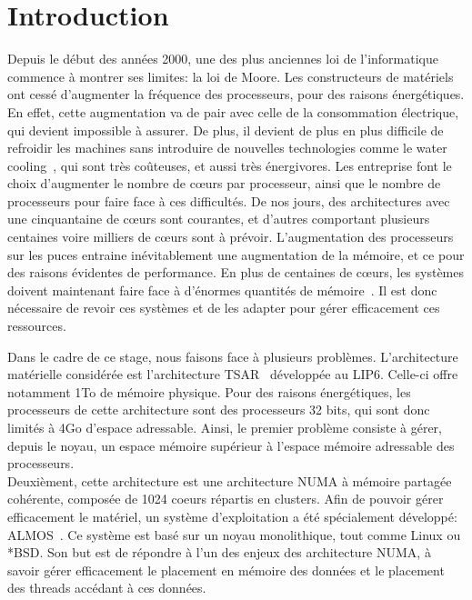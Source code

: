 \chapter{Introduction}

  \hspace{1cm}Depuis le début des années 2000, une des plus anciennes loi de
  l'informatique commence à montrer ses limites: la loi de Moore. Les
  constructeurs de matériels ont cessé d'augmenter la fréquence des processeurs,
  pour des raisons énergétiques. En effet, cette augmentation va de pair avec
  celle de la consommation électrique, qui devient impossible à assurer. De
  plus, il devient de plus en plus difficile de refroidir les machines sans
  introduire de nouvelles technologies comme le water
  cooling~\citep{googleXXXXdatacenters}, qui sont très coûteuses, et aussi très
  énergivores. Les entreprise font le choix d'augmenter le nombre de c\oe urs
  par processeur, ainsi que le nombre de processeurs pour faire face à ces
  difficultés. De nos jours, des architectures avec une cinquantaine de c\oe urs
  sont courantes, et d'autres comportant plusieurs centaines voire milliers de
  c\oe urs sont à prévoir. L'augmentation des processeurs sur les puces entraine
  inévitablement une augmentation de la mémoire, et ce pour des raisons
  évidentes de performance. En plus de centaines de c\oe urs, les systèmes
  doivent maintenant faire face à d'énormes quantités de
  mémoire~\citep{hp2012z820, puget2013z9pe}. Il est donc nécessaire de revoir
  ces systèmes et de les adapter pour gérer efficacement ces ressources.\newline

  \hspace{1cm} Dans le cadre de ce stage, nous faisons face à plusieurs
  problèmes. L'architecture matérielle considérée est l'architecture
  TSAR~\citep{greiner2009tsar} développée au LIP6. Celle-ci offre notamment 1To
  de mémoire physique. Pour des raisons énergétiques, les processeurs de cette
  architecture sont des processeurs 32 bits, qui sont donc limités à 4Go
  d'espace adressable. Ainsi, le premier problème consiste à gérer, depuis le
  noyau, un espace mémoire supérieur à l'espace mémoire adressable des
  processeurs.\\

  Deuxièment, cette architecture est une architecture NUMA à mémoire partagée
  cohérente, composée de 1024 coeurs répartis en clusters. Afin de pouvoir gérer
  efficacement le matériel, un système d'exploitation a été spécialement
  développé: ALMOS~\citep{almaless2011almos}. Ce système est basé sur un noyau
  monolithique, tout comme Linux ou *BSD. Son but est de répondre à l'un des
  enjeux des architecture NUMA, à savoir gérer efficacement le placement en
  mémoire des données et le placement des threads accédant à ces
  données. \\

